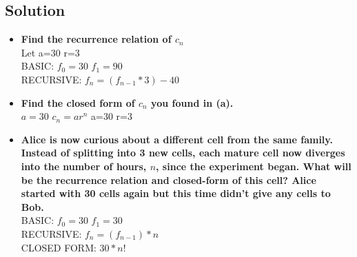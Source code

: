 \documentclass[11pt]{article}
\begin{document}
    \subsection*{Solution}
    \begin{itemize}
        \item \textbf{Find the recurrence relation of \(c_{n}\)} \\
        Let a=30 r=3 \\
        BASIC: \(f_{0}=30\) \(f_{1} = 90\) \\
        RECURSIVE: \(f_{n}=(f_{n-1} *3) -40\)
        \item \textbf{Find the closed form of \(c_{n}\) you found in (a).} \\
        \(a= 30\) \(c_{n}=ar^n\) a=30 r=3
        \item \textbf{Alice is now curious about a different cell from the same family. Instead of splitting into 3 new cells, each mature cell now diverges into the number of hours, \(n\), since the experiment began. What will be the recurrence relation and closed-form of this cell? Alice started with 30 cells again but this time didn’t give any cells to Bob.} \\
        BASIC: \(f_{0}=30\) \(f_{1}=30\) \\
        RECURSIVE: \(f_{n}=(f_{n-1})*n\) \\
        CLOSED FORM: \(30 * n!\)
    \end{itemize}
\end{document}
